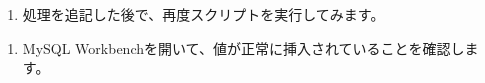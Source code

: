 \begin{Shaded}
\begin{Highlighting}[]
\OperatorTok{=} \NormalTok{(}\VerbatimStringTok{\textasciigrave{}}
\VerbatimStringTok{    );}
\VerbatimStringTok{\textasciigrave{}}\OperatorTok{,}\NormalTok{ [}
    \OperatorTok{,}
    \OperatorTok{,}
    \OperatorTok{,}
     \NormalTok{()}
\NormalTok{    ]}
\NormalTok{)}
\end{Highlighting}
\end{Shaded}

\begin{enumerate}
\def\labelenumi{\arabic{enumi}.}
\setcounter{enumi}{2}
\tightlist
\item
  処理を追記した後で、再度スクリプトを実行してみます。
\end{enumerate}

\begin{Shaded}
\begin{Highlighting}[]
  
\end{Highlighting}
\end{Shaded}

\begin{enumerate}
\def\labelenumi{\arabic{enumi}.}
\setcounter{enumi}{3}
\tightlist
\item
  MySQL Workbenchを開いて、値が正常に挿入されていることを確認します。
\end{enumerate}

\begin{Shaded}
\begin{Highlighting}[]
 \OperatorTok{*} 
\end{Highlighting}
\end{Shaded}
